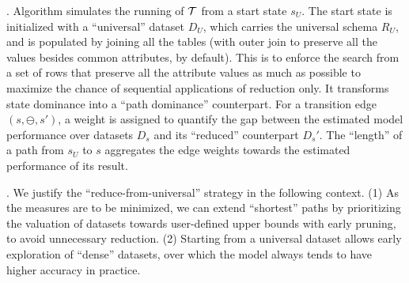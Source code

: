 . 
Algorithm \apxmodis simulates the running of ${\mathcal T}$ from a start state $s_U$. 
The start state is initialized with a ``universal'' dataset $D_U$, 
which carries the universal schema $R_U$, and is populated by 
joining all the tables (with outer join to preserve 
all the values besides common attributes, by default). 
This is to enforce the search 
from a set of rows that 
preserve all the attribute values 
as much as possible to maximize 
the chance of sequential 
applications of reduction only. 
It transforms state dominance into a ``path dominance'' counterpart. 
For a transition edge $(s,\ominus, s')$, 
a weight is assigned 
to quantify the gap between 
the estimated model performance 
over datasets $D_s$ and its ``reduced'' 
counterpart $D_s'$. 
The ``length'' of a path from $s_U$ to $s$ aggregates 
the edge weights towards  
the estimated performance of 
its result. 


\eat{
\mengying{During each transition (edge), one attribute or active domain is reduced, and the edge is weighted based on the performance variance caused by the transition.
The ``depth'' refers to the number of transitions from the initial state to the current state, while the ``shortest path'' denotes the path from the initial state to a target state that yields the dataset with the best performance measures for the given model.
\apxmodis "transforms" state dominance into a "path dominance" counterpart by assigning the valuated measures of end nodes to the paths from the initial state at runtime.}
}

. We justify the ``reduce-from-universal'' 
strategy in the following context. 
(1) As the measures are 
to be minimized, 
we can extend ``shortest'' paths 
by prioritizing the valuation of datasets 
towards user-defined upper bounds 
with early pruning, to avoid   
unnecessary reduction. 
(2) Starting from a universal dataset allows early exploration of ``dense'' datasets, over which the model always tends to have higher accuracy in practice. 



